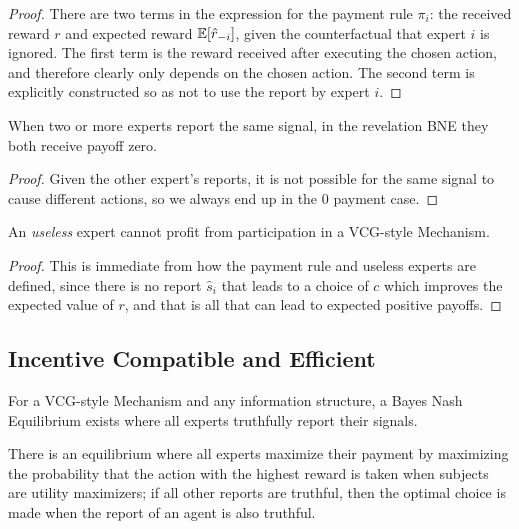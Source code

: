 \begin{proof}
There are two terms in the expression for the payment rule $\pi_i$: the received reward $r$ and expected reward $\operatorname*{\mathbb E}[\hat{r}_{-i}]$, given the counterfactual that expert $i$ is ignored. 
The first term is the reward received after executing the chosen action, and therefore clearly only depends on the chosen action. 
The second term is explicitly constructed so as not to use the report by expert $i$. 
\end{proof}


\begin{prop}
	When two or more experts report the same signal, in the revelation BNE they both receive payoff zero. 
\end{prop}

\begin{proof}
	Given the other expert's reports, it is not possible for the same signal to cause different actions, so we always end up in the 0 payment case.
\end{proof}


\begin{prop}
	An \emph{useless} expert cannot profit from participation in a VCG-style Mechanism.
\end{prop}

\begin{proof}
	This is immediate from how the payment rule and useless experts are defined, since there is no report $\hat{s}_i$ that leads to a choice of $c$ which improves the expected value of $r$, and that is all that can lead to expected positive payoffs.
\end{proof}


\subsection{Incentive Compatible and Efficient}

\begin{thm}
	For a VCG-style Mechanism and any information structure, a Bayes Nash Equilibrium exists where all experts truthfully report their signals.
\end{thm}

There is an equilibrium where all experts maximize their payment by maximizing the probability that the action with the highest reward is taken when subjects are utility maximizers; if all other reports are truthful, then the optimal choice is made when the report of an agent is also truthful.

